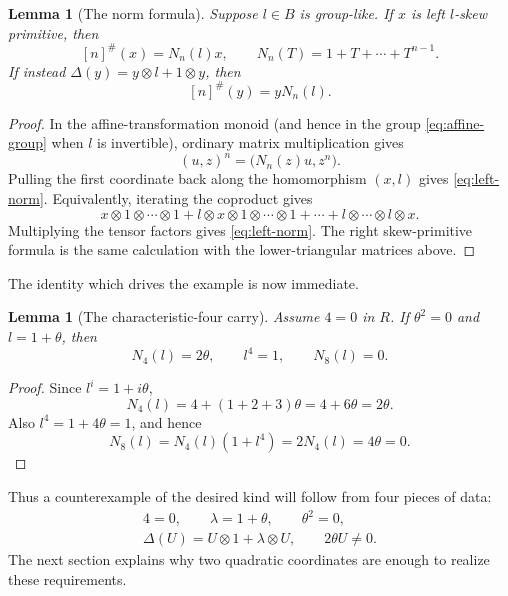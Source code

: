 \documentclass[11pt]{amsart}
\newtheorem{lemma}[theorem]{Lemma}
\theoremstyle{definition}
\theoremstyle{remark}
\newcommand{\ot}{\otimes}
\begin{document}
\begin{lemma}[The norm formula]\label{lem:norm}
Suppose \(l\in B\) is group-like.  If \(x\) is left \(l\)-skew primitive,
then
\begin{equation}\label{eq:left-norm}
 [n]^\#(x)=N_n(l)x,
 \qquad
 N_n(T)=1+T+\cdots+T^{n-1}.
\end{equation}
If instead
\(\Delta(y)=y\ot l+1\ot y\), then
\begin{equation}\label{eq:right-norm}
 [n]^\#(y)=yN_n(l).
\end{equation}
\end{lemma}

\begin{proof}
In the affine-transformation monoid (and hence in the group
\eqref{eq:affine-group} when \(l\) is invertible), ordinary matrix
multiplication gives
\[
 (u,z)^n=\bigl(N_n(z)u,z^n\bigr).
\]
Pulling the first coordinate back along the homomorphism \((x,l)\) gives
\eqref{eq:left-norm}.  Equivalently, iterating the coproduct gives
\[
 x\ot1\ot\cdots\ot1
 +l\ot x\ot1\ot\cdots\ot1
 +\cdots+l\ot\cdots\ot l\ot x.
\]
Multiplying the tensor factors gives \eqref{eq:left-norm}.  The right
skew-primitive formula is the same calculation with the lower-triangular
matrices above.
\end{proof}

The identity which drives the example is now immediate.

\begin{lemma}[The characteristic-four carry]\label{lem:carry}
Assume \(4=0\) in \(R\).  If \(\theta^2=0\) and \(l=1+\theta\), then
\begin{equation}\label{eq:carry}
 N_4(l)=2\theta,
 \qquad
 l^4=1,
 \qquad
 N_8(l)=0.
\end{equation}
\end{lemma}

\begin{proof}
Since \(l^i=1+i\theta\),
\[
 N_4(l)=4+(1+2+3)\theta=4+6\theta=2\theta.
\]
Also \(l^4=1+4\theta=1\), and hence
\[
 N_8(l)=N_4(l)(1+l^4)=2N_4(l)=4\theta=0.
\]
\end{proof}

Thus a counterexample of the desired kind will follow from four pieces of
data:
\begin{equation}\label{eq:design-target}
 \boxed{
 \begin{gathered}
 4=0,\qquad \lambda=1+\theta,\qquad \theta^2=0,\\
 \Delta(U)=U\ot1+\lambda\ot U,
 \qquad 2\theta U\ne0.
 \end{gathered}}
\end{equation}
The next section explains why two quadratic coordinates are enough to
realize these requirements.
\end{document}
